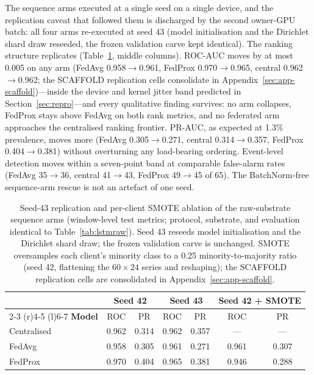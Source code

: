 The sequence arms executed at a single seed on a single
device, and the replication caveat that followed them is discharged
by the second owner-GPU batch: all four arms re-executed at seed 43
(model initialisation and the Dirichlet shard draw reseeded, the
frozen validation carve kept identical). The ranking structure
replicates (Table~\ref{tab:lstmrep}, middle columns).
ROC-AUC moves by at most 0.005 on any arm (FedAvg
0.958$\to$0.961, FedProx 0.970$\to$0.965, central
0.962$\to$0.962; the SCAFFOLD replication cells consolidate in
Appendix~\ref{sec:app-scaffold})---inside the device and
kernel jitter band predicted in Section~\ref{sec:repro}---and
every qualitative finding survives: no arm collapses, FedProx
stays above FedAvg on both rank metrics, and no federated arm
approaches the centralised
ranking frontier. PR-AUC, as expected at 1.3\% prevalence, moves
more (FedAvg 0.305$\to$0.271, central 0.314$\to$0.357, FedProx
0.404$\to$0.381) without overturning any
load-bearing ordering. Event-level detection moves within a
seven-point band at comparable false-alarm rates (FedAvg
35$\to$36, central 41$\to$43, FedProx 49$\to$45 of 65). The BatchNorm-free sequence-arm rescue is not an artefact
of one seed.

\begin{table}[t]
\centering
\caption{Seed-43 replication and per-client SMOTE ablation of the
raw-substrate sequence arms (window-level test metrics; protocol,
substrate, and evaluation identical to
Table~\ref{tab:lstmraw}). Seed 43 reseeds model initialisation and
the Dirichlet shard draw; the frozen validation carve is unchanged.
SMOTE oversamples each client's minority class to a 0.25
minority-to-majority ratio (seed 42, flattening the $60\times24$
series and reshaping); the SCAFFOLD replication cells are
consolidated in Appendix~\ref{sec:app-scaffold}.}
\label{tab:lstmrep}
\small
\begin{tabular}{@{}l cc cc cc@{}}
\toprule
 & \multicolumn{2}{c}{\textbf{Seed 42}} &
 \multicolumn{2}{c}{\textbf{Seed 43}} &
 \multicolumn{2}{c}{\textbf{Seed 42 + SMOTE}} \\
\cmidrule(r){2-3} \cmidrule(r){4-5} \cmidrule(l){6-7}
\textbf{Model} & ROC & PR & ROC & PR & ROC & PR \\
\midrule
Centralised & 0.962 & 0.314 & 0.962 & 0.357 & --- & --- \\
FedAvg & 0.958 & 0.305 & 0.961 & 0.271 & 0.961 & 0.307 \\
FedProx & 0.970 & 0.404 & 0.965 & 0.381 & 0.946 & 0.288 \\
\bottomrule
\end{tabular}
\end{table}

